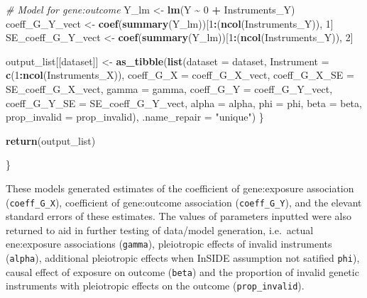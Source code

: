 \documentclass[
]{article}
\newenvironment{Shaded}{\begin{snugshade}}{\end{snugshade}}
\newcommand{\AttributeTok}[1]{\textcolor[rgb]{0.13,0.29,0.53}{#1}}
\newcommand{\CommentTok}[1]{\textcolor[rgb]{0.56,0.35,0.01}{\textit{#1}}}
\newcommand{\DecValTok}[1]{\textcolor[rgb]{0.00,0.00,0.81}{#1}}
\newcommand{\FunctionTok}[1]{\textcolor[rgb]{0.13,0.29,0.53}{\textbf{#1}}}
\newcommand{\NormalTok}[1]{#1}
\newcommand{\OtherTok}[1]{\textcolor[rgb]{0.56,0.35,0.01}{#1}}
\newcommand{\SpecialCharTok}[1]{\textcolor[rgb]{0.81,0.36,0.00}{\textbf{#1}}}
\newcommand{\StringTok}[1]{\textcolor[rgb]{0.31,0.60,0.02}{#1}}
\begin{document}
\begin{Shaded}
\begin{Highlighting}[]
    \CommentTok{\# Model for gene:outcome}
\NormalTok{     Y\_lm }\OtherTok{\textless{}{-}} \FunctionTok{lm}\NormalTok{(Y }\SpecialCharTok{\textasciitilde{}} \DecValTok{0} \SpecialCharTok{+}\NormalTok{ Instruments\_Y)}
\NormalTok{     coeff\_G\_Y\_vect }\OtherTok{\textless{}{-}} \FunctionTok{coef}\NormalTok{(}\FunctionTok{summary}\NormalTok{(Y\_lm))[}\DecValTok{1}\SpecialCharTok{:}\NormalTok{(}\FunctionTok{ncol}\NormalTok{(Instruments\_Y)), }\DecValTok{1}\NormalTok{]}
\NormalTok{     SE\_coeff\_G\_Y\_vect }\OtherTok{\textless{}{-}} \FunctionTok{coef}\NormalTok{(}\FunctionTok{summary}\NormalTok{(Y\_lm))[}\DecValTok{1}\SpecialCharTok{:}\NormalTok{(}\FunctionTok{ncol}\NormalTok{(Instruments\_Y)), }\DecValTok{2}\NormalTok{]}

\NormalTok{     output\_list[[dataset]] }\OtherTok{\textless{}{-}} \FunctionTok{as\_tibble}\NormalTok{(}\FunctionTok{list}\NormalTok{(}\AttributeTok{dataset =}\NormalTok{ dataset,}
                                              \AttributeTok{Instrument =} \FunctionTok{c}\NormalTok{(}\DecValTok{1}\SpecialCharTok{:}\FunctionTok{ncol}\NormalTok{(Instruments\_X)),}
                                              \AttributeTok{coeff\_G\_X =}\NormalTok{ coeff\_G\_X\_vect,}
                                              \AttributeTok{coeff\_G\_X\_SE =}\NormalTok{ SE\_coeff\_G\_X\_vect,}
                                              \AttributeTok{gamma =}\NormalTok{ gamma,}
                                              \AttributeTok{coeff\_G\_Y =}\NormalTok{ coeff\_G\_Y\_vect,}
                                              \AttributeTok{coeff\_G\_Y\_SE =}\NormalTok{ SE\_coeff\_G\_Y\_vect,}
                                              \AttributeTok{alpha =}\NormalTok{ alpha,}
                                              \AttributeTok{phi =}\NormalTok{ phi,}
                                              \AttributeTok{beta =}\NormalTok{ beta,}
                                              \AttributeTok{prop\_invalid =}\NormalTok{ prop\_invalid),}
                                         \AttributeTok{.name\_repair =} \StringTok{"unique"}\NormalTok{)}
\NormalTok{   \}}

   \FunctionTok{return}\NormalTok{(output\_list)}

\NormalTok{ \}}
\end{Highlighting}
\end{Shaded}

These models generated estimates of the coefficient of gene:exposure association (\texttt{coeff\_G\_X}), coefficient of gene:outcome association (\texttt{coeff\_G\_Y}), and the elevant standard errors of these estimates. The values of parameters inputted were also returned to aid in further testing of data/model generation, i.e.~actual ene:exposure associations (\texttt{gamma}), pleiotropic effects of invalid instruments (\texttt{alpha}), additional pleiotropic effects when InSIDE assumption not satified \texttt{phi}), causal effect of exposure on outcome (\texttt{beta}) and the proportion of invalid genetic instruments with pleiotropic effects on the outcome (\texttt{prop\_invalid}).
\end{document}
